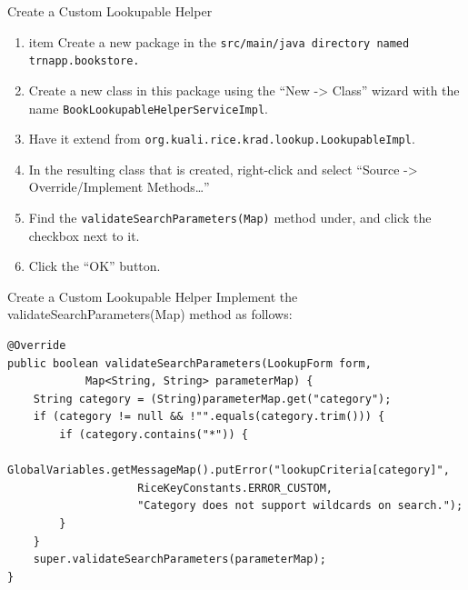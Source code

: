 \documentclass[xcolor=dvipsnames,14pt,professionalfonts]{beamer}
\begin{document}
  \begin{frame}{Create a Custom Lookupable Helper}
 \begin{enumerate}
 \item item Create a new package in the \texttt{src/main/java directory named trnapp.bookstore.}
 \item Create a new class in this package using the “New -> Class”
   wizard with the name \texttt{BookLookupableHelperServiceImpl}.  
 \item Have it extend from \texttt{org.kuali.rice.krad.lookup.LookupableImpl}.
 \item In the resulting class that is created, right-click and select “Source -> Override/Implement Methods…”
 \item Find the \texttt{validateSearchParameters(Map)} method under, and click the checkbox next to it.
 \item Click the “OK” button.
   \end{enumerate}
   \end{frame}

\begin{frame}[fragile]{Create a Custom Lookupable Helper}
 Implement the validateSearchParameters(Map) method as follows:
    \begin{verbatim}
@Override
public boolean validateSearchParameters(LookupForm form,
			Map<String, String> parameterMap) {
	String category = (String)parameterMap.get("category");
	if (category != null && !"".equals(category.trim())) {
		if (category.contains("*")) {
			GlobalVariables.getMessageMap().putError("lookupCriteria[category]", 
                    RiceKeyConstants.ERROR_CUSTOM, 
                    "Category does not support wildcards on search.");
		}
	}
	super.validateSearchParameters(parameterMap);
}
    \end{verbatim}
\end{frame}
\end{document}
